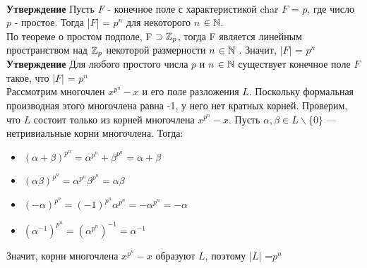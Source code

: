 \ \\
\textbf{Утверждение} Пусть $F$ - конечное поле с характеристикой char $F$ = $p$, где число $p$ - простое. Тогда |$F$| = $p^n$ для некоторого $n$ $\in \mathbb{N}$.
\\
\Proof По теореме о простом подполе, F $\supset \mathbb{Z}_p$, тогда F является линейным
пространством над $\mathbb{Z}_p$ некоторой размерности $n$ $\in \mathbb{N}$ . Значит, |$F$| = $p^n$
\EndProof\\
\textbf{Утверждение} Для любого простого числа $p$ и $n$ $\in \mathbb{N}$ существует конечное поле $F$ такое, что |$F$| = $p^n$
\\
\Proof Рассмотрим многочлен $x^{p^n} - x$ и его поле разложения $L$. Поскольку формальная производная этого многочлена равна -1, у него нет кратных корней.
Проверим, что $L$ состоит только из корней многочлена $x^{p^n} - x$. Пусть $\alpha, \beta \in L \backslash \{0\}$ — нетривиальные корни многочлена. Тогда:
\begin{itemize}
    \item $(\alpha + \beta)^{p^n}= \alpha^{p^n} + \beta^{p^n}= \alpha + \beta$
    \item $(\alpha \beta)^{p^n}= \alpha^{p^n} \beta^{p^n}= \alpha \beta$
    \item $(-\alpha)^{p^n}=(-1)^{p^n} \alpha^{p^n}=  -\alpha^{p^n}= -\alpha$
    \item $(\alpha^{-1})^{p^n}= (\alpha^{p^n})^{-1}= \alpha^{-1}$
\end{itemize}
Значит, корни многочлена $x^{p^n} - x$ образуют $L$, поэтому |$L$| =$p^n$ \EndProof